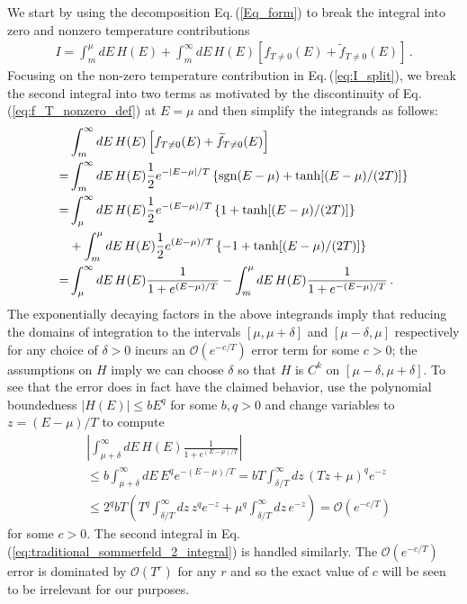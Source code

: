 \documentclass[sn-mathphys,Numbered]{sn-jnl}
\newcommand{\req}[1]{Eq.\,(\ref{#1})}
\begin{document}
We start by using the decomposition \req{Eq_form} to break the integral into zero and nonzero temperature contributions
\begin{align}\label{eq:I_split}
 I= \int_m^\mu dE\, H(E) +\int_m^\infty dE\, H(E) \left[f_{T\neq 0}(E)+\widetilde{f}_{T\neq 0}(E)\right]\,.
\end{align}
Focusing on the non-zero temperature contribution in \req{eq:I_split}, we break the second integral into two terms as motivated by the discontinuity of \req{eq:f_T_nonzero_def} at $E=\mu$ and then simplify the integrands as follows:
\begin{align}
 &\int_m^\infty dE\,H(E) \left[f_{T\neq 0}(E)+\widetilde{f}_{T\neq 0}(E)\right]\\
 = &\int_m^\infty dE\, H(E) \frac{1}{2}e^{-|E-\mu|/T}\left\{\mathrm{sgn}(E-\mu)+\tanh[(E-\mu)/(2T)]\right\}\notag\\
=&\int_\mu^\infty dE\, H(E) \frac{1}{2}e^{-(E-\mu)/T}\left\{1+\tanh[(E-\mu)/(2T)]\right\}\notag\\
&+\int_m^\mu dE\,H(E) \frac{1}{2}e^{(E-\mu)/T}\left\{-1+\tanh[(E-\mu)/(2T)]\right\}\notag\\
=&\int_\mu^\infty dE\, H(E) \frac{1}{1+e^{(E-\mu)/T}}-\int_m^\mu dE\,H(E) \frac{1}{1+e^{-(E-\mu)/T}}\,.\label{eq:traditional_sommerfeld_2_integral}
\end{align}
The exponentially decaying factors in the above integrands imply that reducing the domains of integration to the intervals $[\mu,\mu+\delta]$ and $[\mu-\delta,\mu]$ respectively for any choice of $\delta>0$ incurs an $\mathcal{O}(e^{-c/T})$ error term for some $c>0$; the assumptions on $H$ imply we can choose $\delta$ so that $H$ is $C^k$ on $[\mu-\delta,\mu+\delta]$. To see that the error does in fact have the claimed behavior, use the polynomial boundedness $|H(E)|\leq bE^q$ for some $b,q>0$ and change variables to $z=(E-\mu)/T$ to compute
\begin{equation}\label{eq:change_limits_int_exponential_decay}
 \begin{split}
 &\left|\int_{\mu+\delta}^\infty dE\, H(E)\frac{1}{1+e^{(E-\mu)/T}}\right|\\
 &\leq b\int_{\mu+\delta}^\infty dE\,E^q e^{-(E-\mu)/T} = bT\int_{\delta/T}^\infty dz\,(Tz+\mu)^q e^{-z}\\
 &\leq 2^qbT\left(T^q \int_{\delta/T}^\infty dz\,z^q e^{-z}+\mu^q \int_{\delta/T}^\infty dz\,e^{-z}\right) =\mathcal{O}\left(e^{-c/T}\right)
 \end{split}
\end{equation}
for some $c>0$. The second integral in \req{eq:traditional_sommerfeld_2_integral} is handled similarly. The $\mathcal{O}(e^{-c/T})$ error is dominated by $\mathcal{O}(T^{r})$ for any $r$ and so the exact value of $c$ will be seen to be irrelevant for our purposes.
\end{document}
